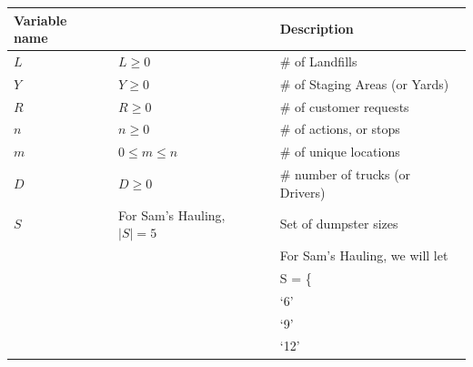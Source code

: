 \documentclass{article}
\begin{document}
\begin{tabular}{ l | l | l }
 Variable name                 &                                                                & Description                                                   \\
\hline
  $L$                          & $  L \ge 0                                                  $  & \# of Landfills                                               \\
  $Y$                          & $  Y \ge 0                                                  $  & \# of Staging Areas (or Yards)                                \\
  $R$                          & $  R \ge 0                                                  $  & \# of customer requests                                       \\
  $n$                          & $  n \ge 0                                                  $  & \# of actions, or stops                                       \\
  $m$                          &   $0 \le m \le n$                                              & \# of unique locations                                        \\
  $D$                          & $  D \ge 0                                                  $  & \# number of trucks (or Drivers)                              \\
  $S$                          &   For Sam's Hauling, $ |S| = 5$                                & Set of dumpster sizes                                         \\
                               & $                                                           $  & For Sam's Hauling, we will let                                \\
                               & $                                                           $  & S = \{                                                        \\
                               & $                                                           $  &   `6'                                                         \\
                               & $                                                           $  &   `9'                                                         \\
                               & $                                                           $  &   `12'                                                        \\

\end{tabular}
\end{document}

